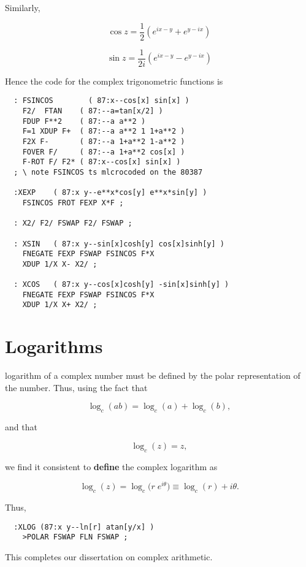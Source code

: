 Similarly,

\begin{equation}
  \cos z = \frac{1}{2 }\left(e^{ix-y} + e^{y - ix}\right)
\end{equation}

\begin{equation}
  \sin z = \frac{1}{2i}\left(e^{ix-y} - e^{y - ix}\right)
\end{equation}

Hence the code for the complex trigonometric functions is

\begin{lstlisting}
  : FSINCOS        ( 87:x--cos[x] sin[x] )
    F2/  FTAN    ( 87:--a=tan[x/2] )
    FDUP F**2    ( 87:--a a**2 )
    F=1 XDUP F+  ( 87:--a a**2 1 1+a**2 )
    F2X F-       ( 87:--a 1+a**2 1-a**2 )
    FOVER F/     ( 87:--a 1+a**2 cos[x] )
    F-ROT F/ F2* ( 87:x--cos[x] sin[x] )
  ; \ note FSINCOS ts mlcrocoded on the 80387

  :XEXP    ( 87:x y--e**x*cos[y] e**x*sin[y] )
    FSINCOS FROT FEXP X*F ;

  : X2/ F2/ FSWAP F2/ FSWAP ;

  : XSIN   ( 87:x y--sin[x]cosh[y] cos[x]sinh[y] )
    FNEGATE FEXP FSWAP FSINCOS F*X
    XDUP 1/X X- X2/ ;

  : XCOS   ( 87:x y--cos[x]cosh[y] -sin[x]sinh[y] )
    FNEGATE FEXP FSWAP FSINCOS F*X
    XDUP 1/X X+ X2/ ;
\end{lstlisting}

\section{Logarithms}
 logarithm of a complex number must be defined by the polar representation of the number. Thus, using the fact that

\begin{equation}
  \log_c(ab) = \log_c(a) + \log_c(b) ,
\end{equation}

and that

\begin{equation}
  \log_c(z) = z ,
\end{equation}

we find it consistent to \textbf{define} the complex logarithm as

\begin{equation}
  \log_c(z) = \log_c\big(r\;e^{i\theta}\big) \equiv \log_c(r) + i\theta.
\end{equation}

Thus,

\begin{lstlisting}
  :XLOG (87:x y--ln[r] atan[y/x] )
    >POLAR FSWAP FLN FSWAP ;
\end{lstlisting}

This completes our dissertation on complex arithmetic.

